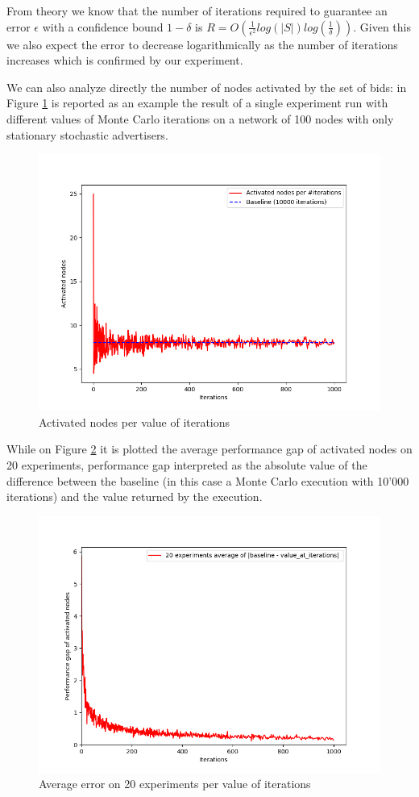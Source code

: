 \documentclass{article}
\begin{document}
From theory we know that the number of iterations required to guarantee an error $\epsilon$ with a confidence bound $1-\delta$ is $R = O(\frac{1}{\epsilon^2}log(|S|)log(\frac{1}{\delta}))$. Given this we also expect the error to decrease logarithmically as the number of iterations increases which is confirmed by our experiment.
\newline

We can also analyze directly the number of nodes activated by the set of bids: in Figure \ref{fig:step1-1} is reported as an example the result of a single experiment run with different values of Monte Carlo iterations on a network of 100 nodes with only stationary stochastic advertisers.

\begin{figure}[H]
    \centering
    \includegraphics[width=0.66\linewidth]{images/step1-1-100nodes.png}
    \caption{Activated nodes per value of iterations}
    \label{fig:step1-1}
\end{figure}

While on Figure \ref{fig:step1-2} it is plotted the average performance gap of activated nodes on 20 experiments, performance gap interpreted as the absolute value of the difference between the baseline (in this case a Monte Carlo execution with 10'000 iterations) and the value returned by the execution.

\begin{figure}[H]
    \centering
    \includegraphics[width=0.66\linewidth]{images/step1-2-100nodes.png}
    \caption{Average error on 20 experiments per value of iterations}
    \label{fig:step1-2}
\end{figure}
\end{document}
